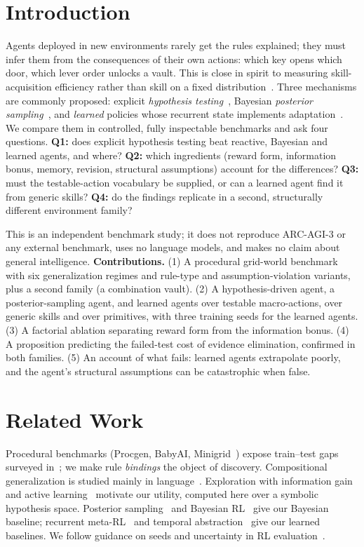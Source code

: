 \documentclass[runningheads]{llncs}
\begin{document}
\section{Introduction}
Agents deployed in new environments rarely get the rules explained; they must infer them from the consequences of their own actions: which key opens which door, which lever order unlocks a vault. This is close in spirit to measuring skill-acquisition efficiency rather than skill on a fixed distribution~\cite{chollet2019}. Three mechanisms are commonly proposed: explicit \emph{hypothesis testing}~\cite{klahr1988,gopnik1997,tenenbaum2011}, Bayesian \emph{posterior sampling}~\cite{strens2000,osband2013}, and \emph{learned} policies whose recurrent state implements adaptation~\cite{duan2016,wang2016}. We compare them in controlled, fully inspectable benchmarks and ask four questions. \textbf{Q1:} does explicit hypothesis testing beat reactive, Bayesian and learned agents, and where? \textbf{Q2:} which ingredients (reward form, information bonus, memory, revision, structural assumptions) account for the differences? \textbf{Q3:} must the testable-action vocabulary be supplied, or can a learned agent find it from generic skills? \textbf{Q4:} do the findings replicate in a second, structurally different environment family?

This is an independent benchmark study; it does not reproduce ARC-AGI-3 or any external benchmark, uses no language models, and makes no claim about general intelligence. \textbf{Contributions.} (1) A procedural grid-world benchmark with six generalization regimes and rule-type and assumption-violation variants, plus a second family (a combination vault). (2) A hypothesis-driven agent, a posterior-sampling agent, and learned agents over testable macro-actions, over generic skills and over primitives, with three training seeds for the learned agents. (3) A factorial ablation separating reward form from the information bonus. (4) A proposition predicting the failed-test cost of evidence elimination, confirmed in both families. (5) An account of what fails: learned agents extrapolate poorly, and the agent's structural assumptions can be catastrophic when false.

\section{Related Work}
Procedural benchmarks (Procgen, BabyAI, Minigrid~\cite{cobbe2020,chevalier2019,chevalier2023}) expose train--test gaps surveyed in~\cite{kirk2023}; we make rule \emph{bindings} the object of discovery. Compositional generalization is studied mainly in language~\cite{lake2018,keysers2020}. Exploration with information gain~\cite{bellemare2016,pathak2017,houthooft2016} and active learning~\cite{settles2009} motivate our utility, computed here over a symbolic hypothesis space. Posterior sampling~\cite{thompson1933,strens2000,osband2013} and Bayesian RL~\cite{ghavamzadeh2015} give our Bayesian baseline; recurrent meta-RL~\cite{duan2016,wang2016,finn2017,zintgraf2020} and temporal abstraction~\cite{sutton1999} give our learned baselines. We follow guidance on seeds and uncertainty in RL evaluation~\cite{henderson2018,colas2018,agarwal2021}.
\end{document}

